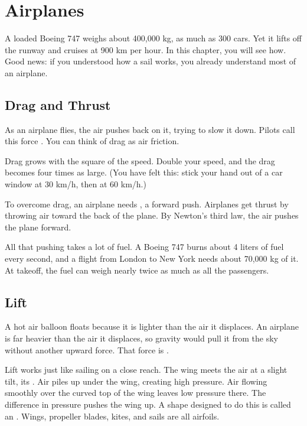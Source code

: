 \chapter{Airplanes}

A loaded Boeing 747 weighs about 400,000 kg, as much as 300 cars. Yet it
lifts off the runway and cruises at 900 km per hour. In this chapter, you will see how.
Good news: if you understood how a sail works, you already understand
most of an airplane.

\section{Drag and Thrust}

As an airplane flies, the air pushes back on it, trying to slow it down.
Pilots call this force . You can think of drag as
air friction.

Drag grows with the square of the speed. Double your speed, and the drag
becomes four times as large. (You have felt this: stick your hand out of a
car window at 30 km/h, then at 60 km/h.)

To overcome drag, an airplane needs , a
forward push. Airplanes get thrust by throwing air toward the back of the
plane. By Newton's third law, the air pushes the plane forward.

All that pushing takes a lot of fuel. A Boeing 747 burns about 4 liters of
fuel every second, and a flight from London to New York needs about
70,000 kg of it. At takeoff, the fuel can weigh nearly twice as much as all
the passengers.

\section{Lift}

A hot air balloon floats because it is lighter than the air it displaces.
An airplane is far heavier than the air it displaces, so gravity would pull
it from the sky without another upward force. That force is
.

Lift works just like sailing on a close reach. The wing meets the air at a
slight tilt, its . Air
piles up under the wing, creating high pressure. Air flowing smoothly over
the curved top of the wing leaves low pressure there. The difference in
pressure pushes the wing up. A shape designed to do this is called an
. Wings, propeller blades, kites, and sails
are all airfoils.


